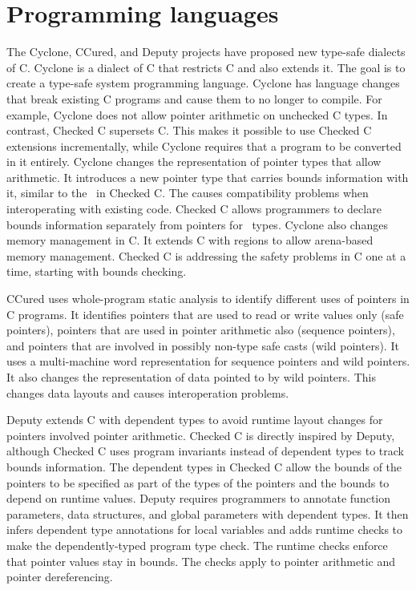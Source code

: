 \section{Programming languages}

The Cyclone, CCured, and Deputy projects have proposed new type-safe dialects 
of C.   Cyclone \cite{Jim2002} is a dialect of C that restricts C and also extends it.  The goal is to create a type-safe system programming
language.  Cyclone has language changes that break existing C programs and
cause them to no longer to compile.  For example, Cyclone does not allow pointer
arithmetic on unchecked C types.   In contrast, Checked C supersets C. This
makes it possible to use Checked C extensions incrementally, while Cyclone
requires that a program to be converted in it entirely.  Cyclone changes the representation of pointer types that allow arithmetic.  It introduces a new 
pointer type that carries bounds information with it, similar to the \spanptr\
in Checked C. The causes compatibility problems when interoperating with existing 
code.   Checked C allows programmers to declare bounds information separately from pointers for \arrayptr\ types.
Cyclone also changes memory management in C.  It extends C with regions
to allow arena-based memory management.  Checked C is addressing the
safety problems in C one at a time, starting with bounds checking. 

CCured \cite{Necula2005} uses whole-program static analysis to identify 
different uses of pointers in C programs. It identifies pointers that are used to
read or write values only (safe pointers), pointers that are used in pointer
arithmetic also (sequence pointers), and pointers that are involved in
possibly non-type safe casts (wild pointers). It uses a multi-machine
word representation for sequence pointers and wild pointers. It also
changes the representation of data pointed to by wild pointers. This
changes data layouts and causes interoperation problems.

Deputy \cite{Condit2007,Feng2006} extends C with dependent types to avoid runtime 
layout changes for pointers involved pointer arithmetic.  Checked C is directly
inspired by Deputy, although Checked C uses program invariants instead of
dependent types to track bounds information.   The dependent types in Checked C
allow the bounds of
the pointers to be specified as part of the types of the pointers and
the bounds to depend on runtime values. Deputy requires programmers to
annotate function parameters, data structures, and global parameters
with dependent types. It then infers dependent type annotations for
local variables and adds runtime checks to make the dependently-typed
program type check. The runtime checks enforce that pointer values stay
in bounds. The checks apply to pointer arithmetic and pointer
dereferencing.

